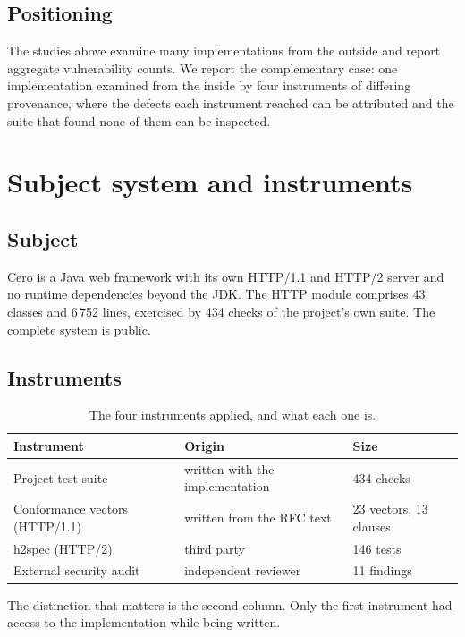 \documentclass[preprint,12pt]{elsarticle}
\begin{document}
\subsection{Positioning}

The studies above examine many implementations from the outside and report
aggregate vulnerability counts. We report the complementary case: one
implementation examined from the inside by four instruments of differing
provenance, where the defects each instrument reached can be attributed and the
suite that found none of them can be inspected.

\section{Subject system and instruments}
\label{sec:subject}

\subsection{Subject}

Cero is a Java web framework with its own HTTP/1.1 and HTTP/2 server and no
runtime dependencies beyond the JDK. The HTTP module comprises 43 classes and
6\,752 lines, exercised by 434 checks of the project's own suite. The complete
system is public.

\subsection{Instruments}

\begin{table}[ht]
\centering
\caption{The four instruments applied, and what each one is.}
\label{tab:instruments}
\begin{tabular}{lll}
\toprule
Instrument & Origin & Size \\
\midrule
Project test suite            & written with the implementation & 434 checks \\
Conformance vectors (HTTP/1.1) & written from the RFC text      & 23 vectors, 13 clauses \\
h2spec (HTTP/2)               & third party \cite{h2spec}       & 146 tests \\
External security audit       & independent reviewer            & 11 findings \\
\bottomrule
\end{tabular}
\end{table}

The distinction that matters is the second column. Only the first instrument
had access to the implementation while being written.
\end{document}
